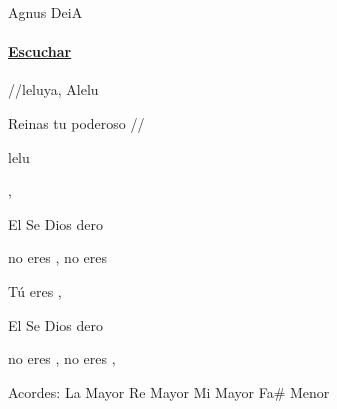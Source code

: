 \documentclass[12pt, spanish]{book}
\newcommand{\NotCCLIed}{\relax}
\begin{document}
    \begin{song}{Agnus Dei}{A}
        {\SBPubDom} %
        { }
        {} %
        {} %
        \ifChordBk
        \paragraph{\mbox{}\hfill\protect\href{https://open.spotify.com/intl-es/track/6LqNz2egKdkGwKDvul2aPn}{Escuchar}\mbox{}\hfill}
        \fi

        \begin{SBChorus}
            //leluya, Alelu

            Reinas tu poderoso //

            lelu
        \end{SBChorus}

        \begin{SBOpGroup}
            , 

            El Se Dios dero

            no eres , no eres 

            Tú eres , 

            El Se Dios dero

            no eres , no eres , 
        \end{SBOpGroup}

        \ifChordBk
        \begin{SBOpGroup}
            Acordes:
            \upchord{\A}\qquad La Mayor \hfill
            \upchord{\D}\qquad Re Mayor \hfill\null\break
            \upchord{\E}\qquad Mi Mayor \hfill
            \upchord{\Fsm}\qquad Fa\# Menor \hfill\null\break
        \end{SBOpGroup}
        \fi
    \end{song}
\end{document}
